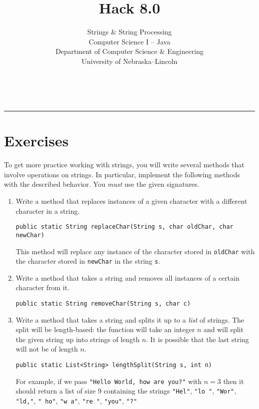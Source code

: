 \documentclass[12pt]{scrartcl}
\title{Hack 8.0}\let\Title\@title
\subtitle{Strings \& String Processing\\
Computer Science I -- Java\\
{\small
\vskip1cm
Department of Computer Science \& Engineering \\
University of Nebraska--Lincoln}
\vskip-1cm}
\date{~}
\begin{document}
\maketitle

\hrule



\section*{Exercises}

To get more practice working with strings, you will write several 
methods that involve operations on strings.  In particular, implement
the following methods with the described behavior.  You \emph{must}
use the given signatures.

\begin{enumerate}

  \item Write a method that replaces instances of a given character 
  with a different character in a string.
  
  \texttt{public static String replaceChar(String s, char oldChar, char newChar)}
  
  This method will replace any instance of the character stored in 
  \texttt{oldChar} with the character stored in \texttt{newChar} 
  in the string \texttt{s}.  

  \item Write a method that takes a string and removes all instances 
  of a certain character from it.
  
  \texttt{public static String removeChar(String s, char c)}

  \item Write a method that takes a string and splits it up to a 
  \emph{list} of strings.  The split will be length-based: the function 
  will take an integer $n$ and will split the given string up into 
  strings of length $n$.  It is possible that the last string will not 
  be of length $n$.
  
  \texttt{public static List<String> lengthSplit(String s, int n)}

  For example, if we pass \texttt{"Hello World, how are you?"} with 
  $n = 3$ then it 
  should return a list of size 9 containing the strings \texttt{"Hel"}, \texttt{"lo "}, \texttt{"Wor"}, 
\texttt{"ld,"}, \texttt{" ho"}, \texttt{"w a"}, \texttt{"re "}, \texttt{"you"}, \texttt{"?"}

\end{enumerate}
\end{document}
